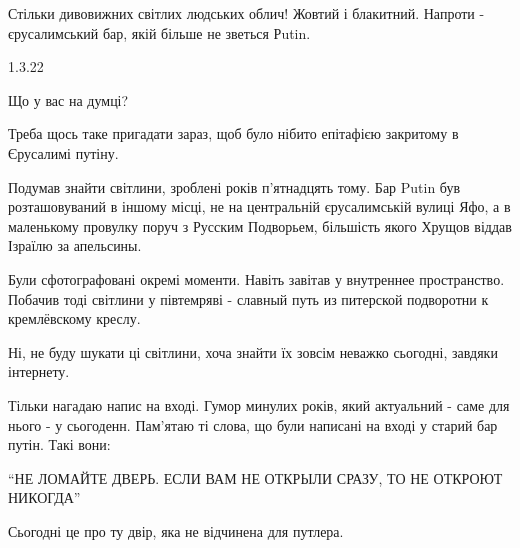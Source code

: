 \begin{itemize}
Стільки дивовижних світлих людських облич! Жовтий і блакитний. Напроти -
єрусалимський бар, якій більше не зветься Рutin.


1.3.22

Що у вас на думці?

Треба щось таке пригадати зараз, щоб було нібито епітафією закритому в
Єрусалимі путіну.

Подумав знайти світлини, зроблені років п'ятнадцять тому. Бар Putin був
розташовуваний в іншому місці, не на центральній єрусалимській вулиці Яфо, а в
маленькому провулку поруч з Русским Подворьем, більшість якого Хрущов віддав
Ізраїлю за апельсины.

Були сфотографовані окремі моменти. Навіть завітав у внутреннее пространство.
Побачив тоді світлини у півтемряві - славный путь из питерской подворотни к
кремлёвскому креслу.

Ні, не буду шукати ці світлини, хоча знайти їх зовсім неважко сьогодні, завдяки
інтернету.

Тільки нагадаю напис на вході. Гумор минулих років, який актуальний - саме для
нього - у сьогоденн. Пам'ятаю ті слова, що були написані на вході у старий бар
путін. Такі вони:

\enquote{НЕ ЛОМАЙТЕ ДВЕРЬ. ЕСЛИ ВАМ НЕ ОТКРЫЛИ СРАЗУ, ТО НЕ ОТКРОЮТ НИКОГДА}

Сьогодні це про ту двір, яка не відчинена для путлера.

\end{itemize} %
